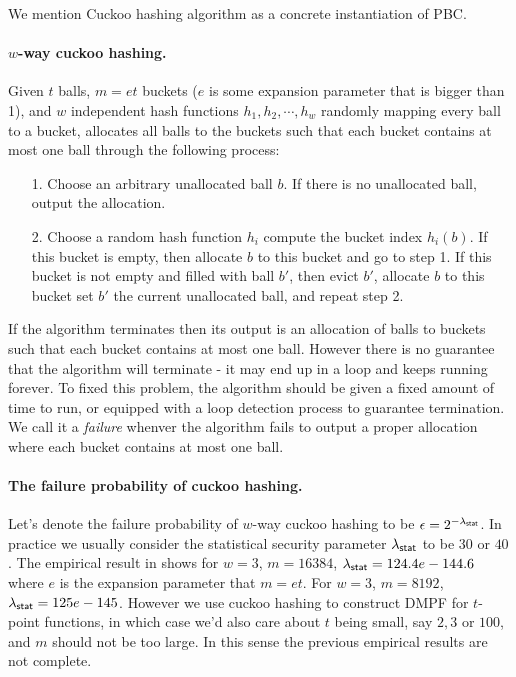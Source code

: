 We mention Cuckoo hashing algorithm\cite{10.1007/3-540-44676-1_10} as a concrete instantiation of PBC\cite{cryptoeprint:2017/1142}.

\paragraph{$w$-way cuckoo hashing.}Given $t$ balls, $m=et$ buckets ($e$ is some expansion parameter that is bigger than 1), and $w$ independent hash functions $h_1, h_2,\cdots, h_w$ randomly mapping every ball to a bucket, allocates all balls to the buckets such that each bucket contains at most one ball through the following process: 
\begin{itemize}
  \item[1.] Choose an arbitrary unallocated ball $b$. If there is no unallocated ball, output the allocation. 
  \item[2.] Choose a random hash function $h_i$ compute the bucket index $h_i(b)$. If this bucket is empty, then allocate $b$ to this bucket and go to step 1. If this bucket is not empty and filled with ball $b'$, then evict $b'$, allocate $b$ to this bucket set $b'$ the current unallocated ball, and repeat step 2. 
\end{itemize}
If the algorithm terminates then its output is an allocation of balls to buckets such that each bucket contains at most one ball. However there is no guarantee that the algorithm will terminate - it may end up in a loop and keeps running forever. To fixed this problem, the algorithm should be given a fixed amount of time to run, or equipped with a loop detection process to guarantee termination. We call it a \emph{failure} whenver the algorithm fails to output a proper allocation where each bucket contains at most one ball. 


\paragraph{The failure probability of cuckoo hashing.}Let's denote the failure probability of $w$-way cuckoo hashing to be $\epsilon=2^{-\lambda_{{\sf stat}}}$. In practice we usually consider the statistical security parameter $\lambda_{{\sf stat}}$ to be $30$ or $40$. The empirical result in \cite{chen_fast_2017} shows for $w=3$, $m=16384$, $\lambda_{\sf stat} = 124.4e-144.6$ where $e$ is the expansion parameter that $m=et$. For $w=3$, $m=8192$, $\lambda_{\sf stat}=125e-145$. However we use cuckoo hashing to construct DMPF for $t$-point functions, in which case we'd also care about $t$ being small, say $2,3$ or $100$, and $m$ should not be too large. In this sense the previous empirical results are not complete. 

